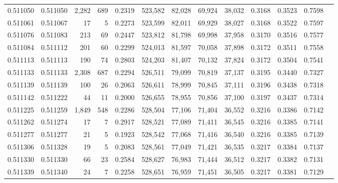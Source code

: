 \begin{tabular}{rrrrrrrrrrrrr}
0.511050 & 0.511050 & 2,282 &   689 &                                     0.2319 & 523,582 &  82,028 &  69,924 &  38,032 & 0.3168 & 0.3523 & 0.7598 \\
0.511061 & 0.511067 &    17 &     5 &                                     0.2273 & 523,599 &  82,011 &  69,929 &  38,027 & 0.3168 & 0.3522 & 0.7597 \\
0.511076 & 0.511083 &   213 &    69 &                                     0.2447 & 523,812 &  81,798 &  69,998 &  37,958 & 0.3170 & 0.3516 & 0.7577 \\
0.511084 & 0.511112 &   201 &    60 &                                     0.2299 & 524,013 &  81,597 &  70,058 &  37,898 & 0.3172 & 0.3511 & 0.7558 \\
0.511113 & 0.511113 &   190 &    74 &                                     0.2803 & 524,203 &  81,407 &  70,132 &  37,824 & 0.3172 & 0.3504 & 0.7541 \\
0.511133 & 0.511133 & 2,308 &   687 &                                     0.2294 & 526,511 &  79,099 &  70,819 &  37,137 & 0.3195 & 0.3440 & 0.7327 \\
0.511139 & 0.511139 &   100 &    26 &                                     0.2063 & 526,611 &  78,999 &  70,845 &  37,111 & 0.3196 & 0.3438 & 0.7318 \\
0.511142 & 0.511222 &    44 &    11 &                                     0.2000 & 526,655 &  78,955 &  70,856 &  37,100 & 0.3197 & 0.3437 & 0.7314 \\
0.511225 & 0.511259 & 1,849 &   548 &                                     0.2286 & 528,504 &  77,106 &  71,404 &  36,552 & 0.3216 & 0.3386 & 0.7142 \\
0.511262 & 0.511274 &    17 &     7 &                                     0.2917 & 528,521 &  77,089 &  71,411 &  36,545 & 0.3216 & 0.3385 & 0.7141 \\
0.511277 & 0.511277 &    21 &     5 &                                     0.1923 & 528,542 &  77,068 &  71,416 &  36,540 & 0.3216 & 0.3385 & 0.7139 \\
0.511306 & 0.511328 &    19 &     5 &                                     0.2083 & 528,561 &  77,049 &  71,421 &  36,535 & 0.3217 & 0.3384 & 0.7137 \\
0.511330 & 0.511330 &    66 &    23 &                                     0.2584 & 528,627 &  76,983 &  71,444 &  36,512 & 0.3217 & 0.3382 & 0.7131 \\
0.511339 & 0.511340 &    24 &     7 &                                     0.2258 & 528,651 &  76,959 &  71,451 &  36,505 & 0.3217 & 0.3381 & 0.7129 \\

\end{tabular}
